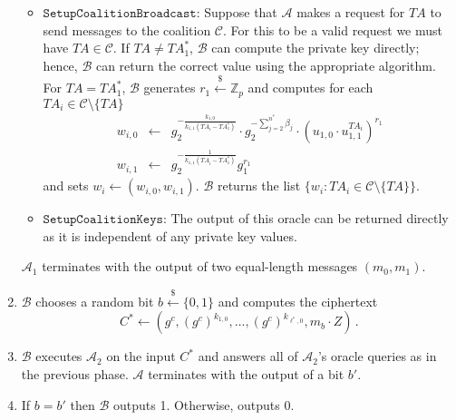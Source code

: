 \documentclass[10pt]{llncs}
\newcommand{\A}{\mathcal{A}}
\newcommand{\B}{\mathcal{B}}
\newcommand{\C}{\mathcal{C}}
\newcommand{\Zbb}{\mathbb{Z}}
\newcommand{\TA}{\mathit{TA}}
\newcommand{\getsr}{\stackrel{{\scriptscriptstyle\$}}{\gets}}
\begin{document}
\begin{enumerate}
\begin{itemize}
    \item $\texttt{SetupCoalitionBroadcast}$: Suppose that $\A$ makes a request for $\TA$ to send messages to the coalition $\C$.
    For this to be a valid request we must have $\TA \in
    \C$. If $\TA \neq \TA^{*}_{1}$, $\B$ can compute the
    private key directly; hence, $\B$ can return the correct
    value using the appropriate algorithm. For
    $\TA=\TA^{*}_{1}$, $\B$ generates $r_{1}\getsr
    \Zbb_{p}$ and computes for each $\TA_{i} \in \C \setminus
    \{\TA\}$
        \begin{eqnarray*}
        w_{i,0} &\gets& g_{2}^{-\frac{k_{1,0}}{k_{1,1}(\TA_{i}-\TA^{*}_{1})}} \cdot g_{2}^{-\sum_{j=2}^{n^{*}}\beta_{j}} \cdot \left( u_{1,0} \cdot u_{1,1}^{\TA_{i}} \right)^{r_{1}}\\
        w_{i,1} &\gets& g_{2}^{-\frac{1}{k_{1,1}(\TA_{i}-\TA^{*}_{1})}}g_{1}^{r_{1}}
        \end{eqnarray*}
        and sets $w_{i}\gets (w_{i,0},w_{i,1})$. $\B$
        returns the list $\{ w_{i} : \TA_{i} \in \C
        \setminus \{\TA\}\}$.
    \item $\texttt{SetupCoalitionKeys}$: The output of this oracle
    can be returned directly as it is independent of any
    private key values.
    \end{itemize}
    $\A_{1}$ terminates with the output of two equal-length
    messages $(m_{0},m_{1})$.
\item $\B$ chooses a random bit $b\getsr \{0,1\}$ and computes the ciphertext
        \begin{displaymath}
        C^{*} \gets (g^{c},(g^{c})^{k_{1,0}}, \ldots,
        (g^{c})^{k_{\ell^{*},0}}, m_{b}\cdot Z) \, .
        \end{displaymath}
\item $\B$ executes $\A_{2}$ on the input $C^{*}$ and answers all of $\A_{2}$'s
oracle queries as in the previous phase. $\A$ terminates with
the output of a bit $b'$.
\item If $b=b'$ then $\B$ outputs 1. Otherwise, outputs 0.
\end{enumerate}
\end{document}
